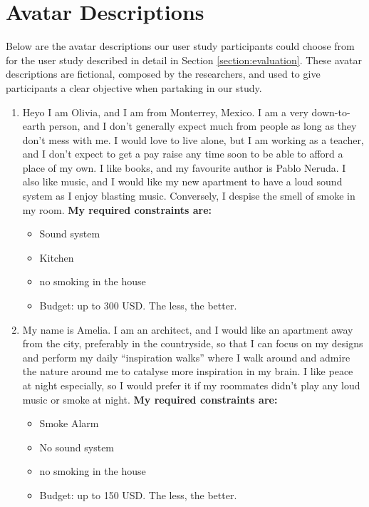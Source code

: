 \appendix

\section{Avatar Descriptions} \label{appendix:avatars}
Below are the avatar descriptions our user study participants could choose from for the user study described in detail in Section \ref{section:evaluation}. These avatar descriptions are fictional, composed by the researchers, and used to give participants a clear objective when partaking in our study. 

\begin{enumerate}
 \item Heyo I am Olivia, and I am from Monterrey, Mexico. I am a very down-to-earth person, and I don’t generally expect much from people as long as they don't mess with me. I would love to live alone, but I am working as a teacher, and I don't expect to get a pay raise any time soon to be able to afford a place of my own. I like books, and my favourite author is Pablo Neruda. I also like music, and I would like my new apartment to have a loud sound system as I enjoy blasting music. Conversely,  I despise the smell of smoke in my room. \textbf{My required constraints are:}
 \begin{itemize}
     \item Sound system
     \item Kitchen
     \item no smoking in the house
     \item Budget: up to 300 USD. The less, the better.
 \end{itemize}

\item My name is Amelia. I am an architect, and I would like an apartment away from the city, preferably in the countryside, so that I can focus on my designs and perform my daily “inspiration walks” where I walk around and admire the nature around me to catalyse more inspiration in my brain. I like peace at night especially, so I would prefer it if my roommates didn’t play any loud music or smoke at night. \textbf{My required constraints are:}
\begin{itemize}
    \item Smoke Alarm 
    \item No sound system
    \item no smoking in the house
    \item Budget: up to 150 USD. The less, the better.
\end{itemize}



\end{enumerate}
